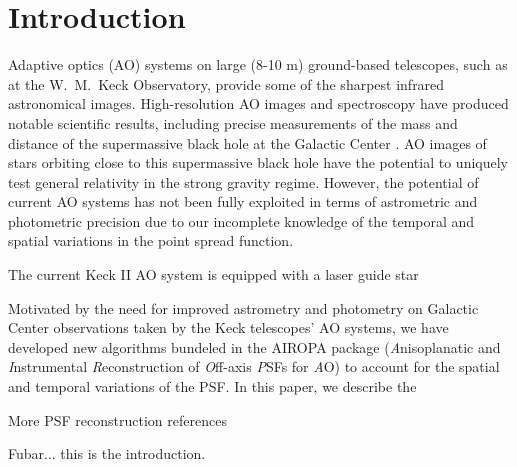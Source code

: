 \maketitle
\section{Introduction}

Adaptive optics (AO) systems on large (8-10 m)
ground-based telescopes, such as at the W.~M.~Keck Observatory,
provide some of the sharpest infrared astronomical images. 
High-resolution AO images and spectroscopy have produced 
notable scientific results, including precise measurements of the mass
and distance of the supermassive black hole at the Galactic Center \cite{Ghez:2008}. 
AO images of stars orbiting close to this supermassive black
hole have the potential to uniquely test general relativity in the strong
gravity regime. However, the potential of current AO systems has not been
fully exploited in terms of astrometric and photometric precision due
to our incomplete knowledge of the temporal and spatial variations in
the point spread function\cite{Lu:2014}. 

The current Keck II AO system is equipped with a laser guide star 


Motivated by the need for improved
astrometry and photometry on Galactic Center observations taken by the
Keck telescopes' AO systems, we have developed new algorithms bundeled
in the AIROPA package ({\it A}nisoplanatic and {\it I}nstrumental {\it
  R}econstruction of {\it O}ff-axis {\it P}SFs for {\it A}O) to
account for the spatial and temporal variations of the PSF. 
In this paper, we describe the 

More PSF reconstruction references \cite{Steinbring:2005,Davies:2012,Trippe:2010}

Fubar... this is the introduction. \cite{Britton:2006}


